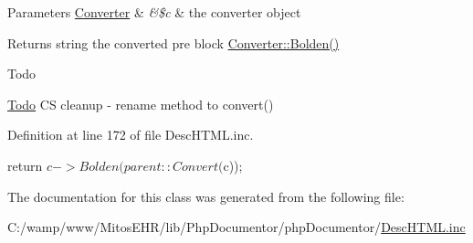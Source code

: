 \begin{DoxyParams}[1]{\-Parameters}
\hyperlink{class_converter}{\-Converter} & {\em \&\$c} & the converter object\\
\hline
\end{DoxyParams}
\begin{DoxyReturn}{\-Returns}
string the converted pre block  \hyperlink{class_converter_a01ca0755f34833af8c7f612b5443bb4d}{\-Converter\-::\-Bolden()} 
\end{DoxyReturn}
\begin{DoxyRefDesc}{\-Todo}
\item[\hyperlink{todo__todo000034}{\-Todo}]\-C\-S cleanup -\/ rename method to convert() \end{DoxyRefDesc}


\-Definition at line 172 of file \-Desc\-H\-T\-M\-L.\-inc.


\begin{DoxyCode}
    {
        return $c->Bolden(parent::Convert($c));
    }
\end{DoxyCode}


\-The documentation for this class was generated from the following file\-:\begin{DoxyCompactItemize}
\item 
\-C\-:/wamp/www/\-Mitos\-E\-H\-R/lib/\-Php\-Documentor/php\-Documentor/\hyperlink{_desc_h_t_m_l_8inc}{\-Desc\-H\-T\-M\-L.\-inc}\end{DoxyCompactItemize}
